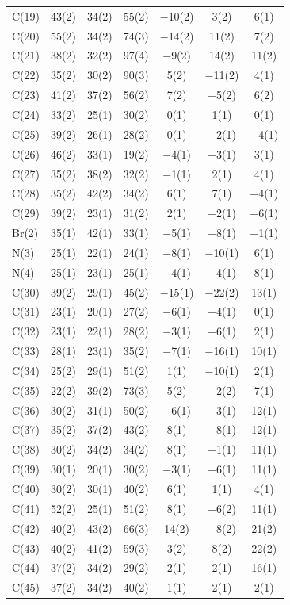 \begin{center}
{\begin{supertabular}{lcccccc}
C(19)&43(2) &34(2)&55(2) &$-$10(2)&3(2) &6(1)\\
C(20)&55(2) &34(2)&74(3) &$-$14(2)&11(2) &7(2)\\
C(21)&38(2) &32(2)&97(4) &$-$9(2)&14(2) &11(2)\\
C(22)&35(2) &30(2)&90(3) &5(2)&$-$11(2) &4(1)\\
C(23)&41(2) &37(2)&56(2) &7(2)&$-$5(2) &6(2)\\
C(24)&33(2) &25(1)&30(2) &0(1)&1(1) &0(1)\\
C(25)&39(2) &26(1)&28(2) &0(1)&$-$2(1) &$-$4(1)\\
C(26)&46(2) &33(1)&19(2) &$-$4(1)&$-$3(1) &3(1)\\
C(27)&35(2) &38(2)&32(2) &$-$1(1)&2(1) &4(1)\\
C(28)&35(2) &42(2)&34(2) &6(1)&7(1) &$-$4(1)\\
C(29)&39(2) &23(1)&31(2) &2(1)&$-$2(1) &$-$6(1)\\
Br(2)&35(1) &42(1)&33(1) &$-$5(1)&$-$8(1) &$-$1(1)\\
N(3)&25(1) &22(1)&24(1) &$-$8(1)&$-$10(1) &6(1)\\
N(4)&25(1) &23(1)&25(1) &$-$4(1)&$-$4(1) &8(1)\\
C(30)&39(2) &29(1)&45(2) &$-$15(1)&$-$22(2) &13(1)\\
C(31)&23(1) &20(1)&27(2) &$-$6(1)&$-$4(1) &0(1)\\
C(32)&23(1) &22(1)&28(2) &$-$3(1)&$-$6(1) &2(1)\\
C(33)&28(1) &23(1)&35(2) &$-$7(1)&$-$16(1) &10(1)\\
C(34)&25(2) &29(1)&51(2) &1(1)&$-$10(1) &2(1)\\
C(35)&22(2) &39(2)&73(3) &5(2)&$-$2(2) &7(1)\\
C(36)&30(2) &31(1)&50(2) &$-$6(1)&$-$3(1) &12(1)\\
C(37)&35(2) &37(2)&43(2) &8(1)&$-$8(1) &12(1)\\
C(38)&30(2) &34(2)&34(2) &8(1)&$-$1(1) &11(1)\\
C(39)&30(1) &20(1)&30(2) &$-$3(1)&$-$6(1) &11(1)\\
C(40)&30(2) &30(1)&40(2) &6(1)&1(1) &4(1)\\
C(41)&52(2) &25(1)&51(2) &8(1)&$-$6(2) &11(1)\\
C(42)&40(2) &43(2)&66(3) &14(2)&$-$8(2) &21(2)\\
C(43)&40(2) &41(2)&59(3) &3(2)&8(2) &22(2)\\
C(44)&37(2) &34(2)&29(2) &2(1)&2(1) &16(1)\\
C(45)&37(2) &34(2)&40(2) &1(1)&2(1) &2(1)\\

\end{supertabular}}
\end{center}
